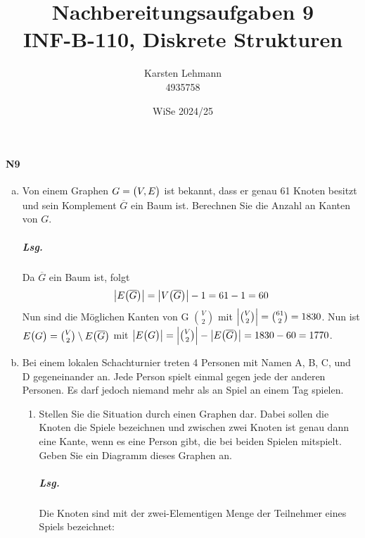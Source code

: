 \documentclass{scrreprt}
\author{Karsten Lehmann \\ 4935758}
\date{WiSe 2024/25}
\title{Nachbereitungsaufgaben 9\\INF-B-110, Diskrete Strukturen}
\begin{document}
\paragraph{N9}
\begin{enumerate}[(a)]
\item Von einem Graphen $G = \qty\big(V, E)$ ist bekannt, dass er genau 61 Knoten
  besitzt und sein Komplement $\overline{G}$ ein Baum ist.
  Berechnen Sie die Anzahl an Kanten von $G$.

  \subparagraph{Lsg.} Da $\overline{G}$ ein Baum ist, folgt
  \[
    \abs{E\qty\big(\overline{G})}
    = \abs{V\qty\big(\overline{G})} - 1 = 61 - 1 = 60
  \]
  Nun sind die Möglichen Kanten von G $\binom{V}{2}$ mit
  $\abs{\binom{V}{2}} = \binom{61}{2} = 1830$.
  Nun ist $E\qty\big(G) = \binom{V}{2} \setminus E\qty\big(\overline{G})$ mit
  $\abs{E\qty\big(G)} = \abs{\binom{V}{2}} - \abs{E\qty\big(\overline{G})}
  = 1830 - 60 = 1770$.

\item Bei einem lokalen Schachturnier treten 4 Personen mit Namen A, B, C, und D
  gegeneinander an.
  Jede Person spielt einmal gegen jede der anderen Personen.
  Es darf jedoch niemand mehr als an Spiel an einem Tag spielen.
  \begin{enumerate}[(1)]
  \item Stellen Sie die Situation durch einen Graphen dar.
    Dabei sollen die Knoten die Spiele bezeichnen und zwischen zwei Knoten ist
    genau dann eine Kante, wenn es eine Person gibt, die bei beiden Spielen
    mitspielt.
    Geben Sie ein Diagramm dieses Graphen an.

    \subparagraph{Lsg.} Die Knoten sind mit der zwei-Elementigen Menge der
    Teilnehmer eines Spiels bezeichnet:

\end{enumerate}
\end{enumerate}
\end{document}
